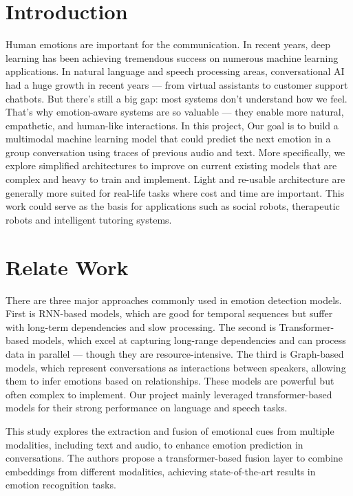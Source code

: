 \documentclass{article}
\begin{document}
\section{Introduction}
Human emotions are important for the  communication. In recent years, deep learning has been achieving tremendous success on numerous machine learning
applications. In natural language and speech processing areas, conversational AI had a huge growth in recent years — from virtual assistants to customer support chatbots. But there’s still a big gap: most systems don’t understand how we feel.
That’s why emotion-aware systems are so valuable — they enable more natural, empathetic, and human-like interactions. In this project, Our goal is to  build a multimodal machine learning model that could predict the next emotion in a group conversation using traces of previous audio and text. More specifically, we explore simplified architectures to improve on current existing models that are complex and heavy to train and implement. Light and re-usable architecture are generally more suited for real-life tasks where cost and time are important. This work could serve as the basis for applications such as social robots, therapeutic robots and intelligent tutoring systems. 

\section{Relate Work}
There are three major approaches commonly used in emotion detection models.
First is RNN-based models, which are good for temporal sequences but suffer with long-term dependencies and slow processing. 
The second is Transformer-based models, which excel at capturing long-range dependencies and can process data in parallel — though they are resource-intensive.
The third is Graph-based models, which represent conversations as interactions between speakers, allowing them to infer emotions based on relationships. These models are powerful but often complex to implement.
Our project mainly leveraged transformer-based models for their strong performance on language and speech tasks.

 This study \cite{ERCFusionModel} explores the extraction and fusion of emotional cues from multiple modalities, including text and audio, to enhance emotion prediction in conversations. The authors propose a transformer-based fusion layer to combine embeddings from different modalities, achieving state-of-the-art results in emotion recognition tasks.
 
\end{document}

